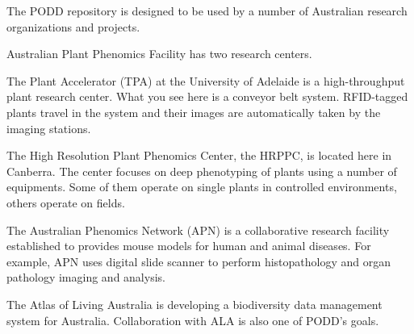 \documentclass[ignorenonframetext,compress]{beamer}
\begin{document}
The PODD repository is designed to be used by a number of Australian
research organizations and projects.

Australian Plant Phenomics Facility has two research centers.

The Plant Accelerator (TPA) at the University of Adelaide is a
high-throughput plant research center. What you see here is a
conveyor belt system. RFID-tagged plants travel in the system and
their images are automatically taken by the imaging stations.

The High Resolution Plant Phenomics Center, the HRPPC, is located
here in Canberra. The center focuses on deep phenotyping of plants
using a number of equipments. Some of them operate on single plants
in controlled environments, others operate on fields.

The Australian Phenomics Network (APN) is a collaborative research
facility established to provides mouse models for human and animal
diseases. For example, APN uses digital slide scanner to perform
histopathology and organ pathology imaging and analysis.

The Atlas of Living Australia is developing a biodiversity data
management system for Australia. Collaboration with ALA is also one
of PODD's goals.
\end{document}
